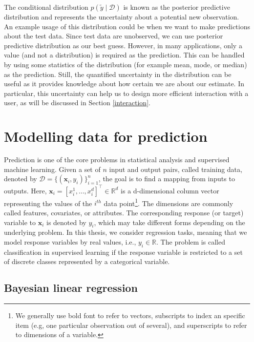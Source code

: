 \documentclass[dissertation,math,vertlayout,pdfa,colorlinks]{aaltoseries}
\newcommand{\bD}{\mathcal{D}}
\newcommand{\tp}{^{\top}}
\begin{document}
\noindent The conditional distribution $p(\tilde{y} \mid \bD)$ is known as the posterior predictive distribution and represents the uncertainty about a potential new observation. An example usage of this distribution could be when we want to make predictions about the test data. Since test data are unobserved, we can use posterior predictive distribution as our best guess. However, in many applications, only a value (and not a distribution) is required as the prediction. This can be handled by using some statistics of the distribution (for example mean, mode, or median) as the prediction. Still, the quantified uncertainty in the distribution can be useful as it provides knowledge about how certain we are about our estimate. In particular, this uncertainty can help us to design more efficient interaction with a user, as will be discussed in Section \ref{interaction}.

	

\section{Modelling data for prediction} \label{prob_model_data}

Prediction is one of the core problems in statistical analysis and supervised machine learning. Given a set of $n$ input and output pairs, called training data, denoted by $\bD= \{(\bm{x}_i,y_i)\}_{i=1}^{n}$, the goal is to find a mapping from inputs to outputs. Here, $\bm{x}_i = [x_i^1,\ldots,x_i^d]\tp \in \mathbb{R}^d$ is a d-dimensional column vector representing the values of the $i^{th}$ data point\footnote{We generally use bold font to refer to vectors, subscripts to index an specific item (e.g, one particular observation out of several), and superscripts to refer to dimensions of a variable.}. The dimensions are commonly called features, covariates, or attributes. The corresponding response (or target) variable to $\bm{x}_i$ is denoted by $y_i$, which may take different forms depending on the underlying problem. In this thesis, we consider regression tasks, meaning that we model response variables by real values, i.e., $y_i \in \mathbb{R}$. The problem is called classification in supervised learning if the response variable is restricted to a set of discrete classes represented by a categorical variable. 

\subsection{Bayesian linear regression}
\end{document}

